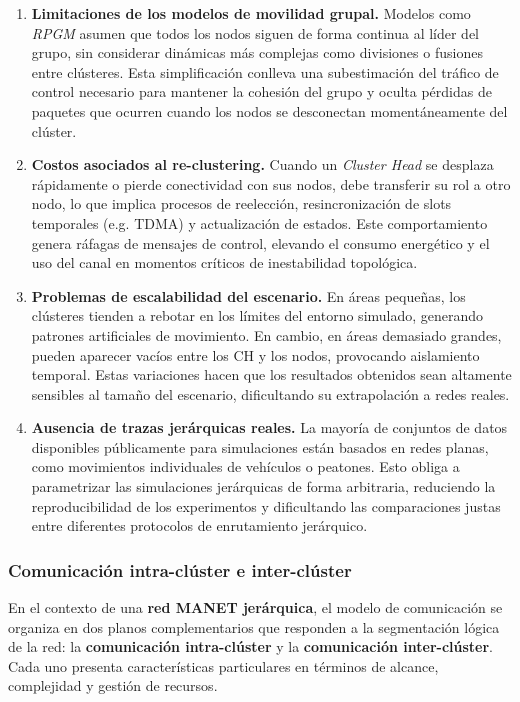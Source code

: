 \documentclass{article}
\begin{document}
\begin{enumerate}
    \item \textbf{Limitaciones de los modelos de movilidad grupal.} 
    Modelos como \textit{RPGM} asumen que todos los nodos siguen de forma continua al líder del grupo, sin considerar dinámicas más complejas como divisiones o fusiones entre clústeres. Esta simplificación conlleva una subestimación del tráfico de control necesario para mantener la cohesión del grupo y oculta pérdidas de paquetes que ocurren cuando los nodos se desconectan momentáneamente del clúster.

    \item \textbf{Costos asociados al re-clustering.}
    Cuando un \textit{Cluster Head} se desplaza rápidamente o pierde conectividad con sus nodos, debe transferir su rol a otro nodo, lo que implica procesos de reelección, resincronización de slots temporales (e.g. TDMA) y actualización de estados. Este comportamiento genera ráfagas de mensajes de control, elevando el consumo energético y el uso del canal en momentos críticos de inestabilidad topológica.

    \item \textbf{Problemas de escalabilidad del escenario.} 
    En áreas pequeñas, los clústeres tienden a rebotar en los límites del entorno simulado, generando patrones artificiales de movimiento. En cambio, en áreas demasiado grandes, pueden aparecer vacíos entre los CH y los nodos, provocando aislamiento temporal. Estas variaciones hacen que los resultados obtenidos sean altamente sensibles al tamaño del escenario, dificultando su extrapolación a redes reales.

    \item \textbf{Ausencia de trazas jerárquicas reales.}
    La mayoría de conjuntos de datos disponibles públicamente para simulaciones están basados en redes planas, como movimientos individuales de vehículos o peatones. Esto obliga a parametrizar las simulaciones jerárquicas de forma arbitraria, reduciendo la reproducibilidad de los experimentos y dificultando las comparaciones justas entre diferentes protocolos de enrutamiento jerárquico.

\end{enumerate}


\subsubsection{Comunicación intra-clúster e inter-clúster}

En el contexto de una \textbf{red MANET jerárquica}, el modelo de comunicación se organiza en dos planos complementarios que responden a la segmentación lógica de la red: la \textbf{comunicación intra-clúster} y la \textbf{comunicación inter-clúster}. Cada uno presenta características particulares en términos de alcance, complejidad y gestión de recursos.
\end{document}
